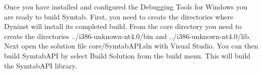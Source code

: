 Once you have installed and configured the Debugging Tools for Windows you are ready to build Symtab. First, you need to create the directories where Dyninst will install its completed build. From the core directory you need to create the directories ../i386-unknown-nt4.0/bin and ../i386-unknown-nt4.0/lib. Next open the solution file core/SymtabAPI.sln with Visual Studio.   You can then build SymtabAPI by select Build Solution from the build menu. This will build the SymtabAPI library.

